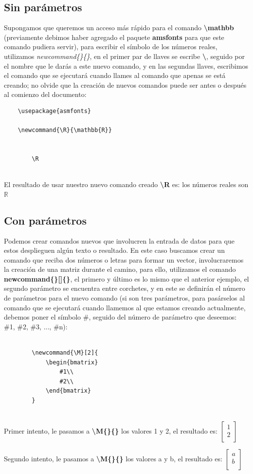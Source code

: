 \subsection{Sin parámetros}
\hspace{0.55cm}Supongamos que queremos un acceso más rápido para el comando \textbf{\textbackslash{mathbb}} (previamente debimos haber agregado el paquete \textbf{amsfonts} para que este comando pudiera servir), para escribir el símbolo de los números reales, utilizamos \textit{newcommand\{\}\{\}}, en el primer par de llaves se escribe \textbf{\textbackslash}, seguido por el nombre que le darás a este nuevo comando, y en las segundas llaves, escribimos el comando que se ejecutará cuando llames al comando que apenas se está creando; no olvide que la creación de nuevos comandos puede ser antes o después al comienzo del documento:
\begin{lstlisting}
    \usepackage{asmfonts}
    
    \newcommand{\R}{\mathbb{R}}
    
    
        \R
    
\end{lstlisting}

\newcommand{\R}{\mathbb{R}}

El resultado de usar nuestro nuevo comando creado \textbf{\textbackslash{R}} es: los números reales son $\R$

\subsection{Con parámetros}
\hspace{0.55cm}Podemos crear comandos nuevos que involucren la entrada de datos para que estos desplieguen algún texto o resultado. En este caso buscamos crear un comando que reciba dos números o letras para formar un vector, involucraremos la creación de una matriz durante el camino, para ello, utilizamos el comando \textbf{newcommand\{\}[]\{\}}, el primero y último es lo mismo que el anterior ejemplo, el segundo parámetro se encuentra entre corchetes, y en este se definirán el número de parámetros para el nuevo comando (si son tres parámetros, para pasárselos al comando que se ejecutará cuando llamemos al que estamos creando actualmente, debemos poner el símbolo \#, seguido del número de parámetro que deseemos: \#1, \#2, \#3, ..., \#n):
\begin{lstlisting}
    
        \newcommand{\M}[2]{
            \begin{bmatrix}
	            #1\\
	            #2\\
            \end{bmatrix}
        }
    
\end{lstlisting}
\newcommand{\M}[2]{\begin{bmatrix}
	#1\\
	#2\\
\end{bmatrix}
}

Primer intento, le pasamos a \textbf{\textbackslash{M\{\}\{\}}} los valores 1 y 2, el resultado es: $\M{1}{2}$

Segundo intento, le pasamos a \textbf{\textbackslash{M\{\}\{\}}} los valores a y b, el resultado es: $\M{a}{b}$